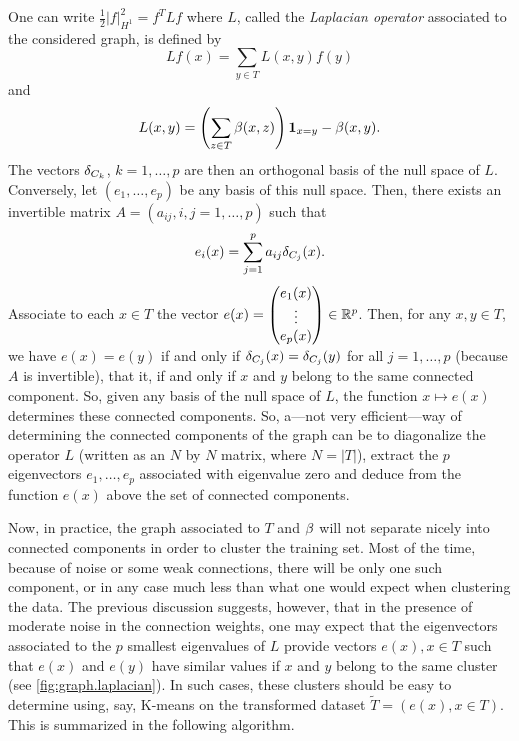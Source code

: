 One can write $\frac12 |f|^2_{H^1} = f^T L f$ where $L$, called the {\em Laplacian operator} associated to the considered graph, is defined by
\[
Lf(x) = \sum_{y\in T} L(x,y) f(y)
\]
and 
\begin{equation}
\label{eq:laplacian.graph}
L(x,y) =\left( \sum_{z\in T} \beta(x,z)\right) {\bm 1}_{x=y} - \beta(x,y).
\end{equation}
The vectors $\delta_{C_k}$, $k=1, \ldots, p$ are then an orthogonal basis of the null space of $L$. Conversely, let $(e_1, \ldots, e_p)$ be any  basis of this null space. Then, there exists an invertible matrix $A = (a_{ij}, i,j=1, \ldots, p)$ such that
\[
e_i(x) = \sum_{j=1}^p a_{ij} \delta_{C_j}(x).
\]
Associate to each $x\in T$ the vector $e(x) = \begin{pmatrix} e_1(x)\\ \vdots\\ e_p(x)\end{pmatrix}\in{\mathbb{R}}^p$. Then, for any $x,y\in T$, we have $e(x) = e(y)$ if and only if $\delta_{C_j}(x) = \delta_{C_j}(y)$ for all $j=1, \ldots, p$ (because $A$ is invertible), that it, if and only if $x$ and $y$ belong to the same connected component. So, given any basis of the null space of $L$,  the function $x\mapsto e(x)$ determines these connected components.
 So, a---not very efficient---way of determining the connected components of the graph can be to diagonalize the operator $L$ (written as an $N$ by $N$ matrix, where $N=|T|$), extract the $p$ eigenvectors $e_1, \ldots, e_p$ associated with eigenvalue zero and deduce from the function $e(x)$ above the set of connected components.
 
Now, in practice, the graph associated to $T$ and $\beta$ will not separate nicely into connected components in order to cluster the training set. Most of the time, because of noise or some weak connections, there will be only one such component, or in any case much less than what one would expect when clustering the data. The previous discussion suggests, however, that in the presence of moderate noise in the connection weights, one may expect that the eigenvectors associated to the $p$ smallest eigenvalues of $L$ provide vectors $e(x), x\in T$ such that $e(x)$ and $e(y)$ have similar values if $x$ and $y$ belong to the same cluster (see \ref{fig:graph.laplacian}). In such cases, these clusters should be easy to determine using, say,  K-means on the transformed dataset $\tilde T = (e(x), x\in T)$. This is summarized in the following algorithm.

